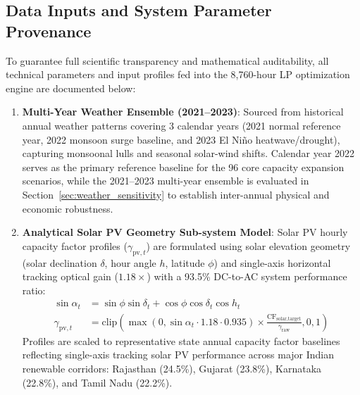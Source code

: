 \documentclass[11pt,a4paper]{article}
\begin{document}
\subsection{Data Inputs and System Parameter Provenance}
\label{sec:data_inputs}

To guarantee full scientific transparency and mathematical auditability, all technical parameters and input profiles fed into the 8,760-hour LP optimization engine are documented below:

\begin{enumerate}
    \item \textbf{Multi-Year Weather Ensemble (2021--2023)}: Sourced from historical annual weather patterns covering 3 calendar years (2021 normal reference year, 2022 monsoon surge baseline, and 2023 El Niño heatwave/drought), capturing monsoonal lulls and seasonal solar-wind shifts. Calendar year 2022 serves as the primary reference baseline for the 96 core capacity expansion scenarios, while the 2021--2023 multi-year ensemble is evaluated in Section~\ref{sec:weather_sensitivity} to establish inter-annual physical and economic robustness.

    \item \textbf{Analytical Solar PV Geometry Sub-system Model}: Solar PV hourly capacity factor profiles ($\gamma_{\text{pv},t}$) are formulated using solar elevation geometry (solar declination $\delta$, hour angle $h$, latitude $\phi$) and single-axis horizontal tracking optical gain ($1.18\times$) with a 93.5\% DC-to-AC system performance ratio:
    \begin{align}
    \sin \alpha_t &= \sin \phi \sin \delta_t + \cos \phi \cos \delta_t \cos h_t \label{eq:solar_elev} \\
    \gamma_{\text{pv},t} &= \text{clip}\left( \max(0, \sin \alpha_t \cdot 1.18 \cdot 0.935) \times \frac{\text{CF}_{\text{solar,target}}}{\overline{\gamma}_{\text{raw}}}, 0, 1 \right) \label{eq:solar_prof}
    \end{align}
    Profiles are scaled to representative state annual capacity factor baselines reflecting single-axis tracking solar PV performance across major Indian renewable corridors: Rajasthan (24.5\%), Gujarat (23.8\%), Karnataka (22.8\%), and Tamil Nadu (22.2\%).


\end{enumerate}
\end{document}
